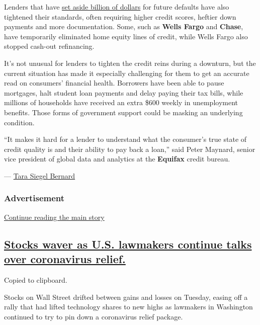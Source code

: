 Lenders that have
\href{https://www.nytimes3xbfgragh.onion/2020/07/14/business/big-banks-quarterly-results.html}{set
aside billion of dollars} for future defaults have also tightened their
standards, often requiring higher credit scores, heftier down payments
and more documentation. Some, such as \textbf{Wells Fargo} and
\textbf{Chase}, have temporarily eliminated home equity lines of credit,
while Wells Fargo also stopped cash-out refinancing.

It's not unusual for lenders to tighten the credit reins during a
downturn, but the current situation has made it especially challenging
for them to get an accurate read on consumers' financial health.
Borrowers have been able to pause mortgages, halt student loan payments
and delay paying their tax bills, while millions of households have
received an extra \$600 weekly in unemployment benefits. Those forms of
government support could be masking an underlying condition.

``It makes it hard for a lender to understand what the consumer's true
state of credit quality is and their ability to pay back a loan,'' said
Peter Maynard, senior vice president of global data and analytics at the
\textbf{Equifax} credit bureau.

---
\href{https://www.nytimes3xbfgragh.onion/by/tara-siegel-bernard}{Tara
Siegel Bernard}

\hypertarget{advertisement-1}{%
\subsubsection{Advertisement}\label{advertisement-1}}

\protect\hyperlink{after-dfp-ad-mid2}{Continue reading the main story}

\hypertarget{stocks-waver-as-us-lawmakers-continue-talks-over-coronavirus-relief}{%
\subsection{\texorpdfstring{\protect\hyperlink{stocks-waver-as-us-lawmakers-continue-talks-over-coronavirus-relief}{Stocks
waver as U.S. lawmakers continue talks over coronavirus
relief.}}{Stocks waver as U.S. lawmakers continue talks over coronavirus relief.}}\label{stocks-waver-as-us-lawmakers-continue-talks-over-coronavirus-relief}}

Copied to clipboard.

Stocks on Wall Street drifted between gains and losses on Tuesday,
easing off a rally that had lifted technology shares to new highs as
lawmakers in Washington continued to try to pin down a coronavirus
relief package.

